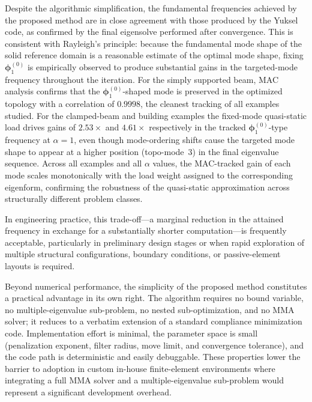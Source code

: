 \documentclass[applsci,article,submit,pdftex,moreauthors]{Definitions/mdpi}
\begin{document}
\begin{sloppypar}
Despite the algorithmic simplification, the fundamental frequencies achieved by the proposed method are in close agreement with those produced by the Yuksel code, as confirmed by the final eigensolve performed after convergence. This is consistent with Rayleigh's principle: because the fundamental mode shape of the solid reference domain is a reasonable estimate of the optimal mode shape, fixing $\boldsymbol{\phi}_1^{(0)}$ is empirically observed to produce substantial gains in the targeted-mode frequency throughout the iteration. For the simply supported beam, MAC analysis confirms that the $\boldsymbol{\phi}_1^{(0)}$-shaped mode is preserved in the optimized topology with a correlation of $0.9998$, the cleanest tracking of all examples studied. For the clamped-beam and building examples the fixed-mode quasi-static load drives gains of $2.53\times$ and $4.61\times$ respectively in the tracked $\boldsymbol{\phi}_1^{(0)}$-type frequency at $\alpha=1$, even though mode-ordering shifts cause the targeted mode shape to appear at a higher position (topo-mode~3) in the final eigenvalue sequence. Across all examples and all $\alpha$ values, the MAC-tracked gain of each mode scales monotonically with the load weight assigned to the corresponding eigenform, confirming the robustness of the quasi-static approximation across structurally different problem classes.

In engineering practice, this trade-off---a marginal reduction in the attained frequency in exchange for a substantially shorter computation---is frequently acceptable, particularly in preliminary design stages or when rapid exploration of multiple structural configurations, boundary conditions, or passive-element layouts is required.
\end{sloppypar}

Beyond numerical performance, the simplicity of the proposed method constitutes a practical advantage in its own right. The algorithm requires no bound variable, no multiple-eigenvalue sub-problem, no nested sub-optimization, and no MMA solver; it reduces to a verbatim extension of a standard compliance minimization code. Implementation effort is minimal, the parameter space is small (penalization exponent, filter radius, move limit, and convergence tolerance), and the code path is deterministic and easily debuggable. These properties lower the barrier to adoption in custom in-house finite-element environments where integrating a full MMA solver and a multiple-eigenvalue sub-problem would represent a significant development overhead.
\end{document}
